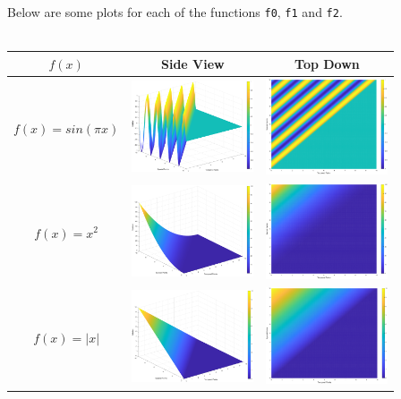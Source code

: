 \documentclass[]{report}
\def\incode#1{\texttt{#1}}
\begin{document}
	Below are some plots for each of the functions \incode{f0}, \incode{f1} and \incode{f2}. 
	\\\\
	\begin{tabular}{|c|c|c|}
		\hline
		$ f(x) $ & Side View & Top Down  \\
		\hline 
		$ f(x) = sin(\pi x) $ & \includegraphics[width=3.6cm]{transport/f0_side.eps} & \includegraphics[width=3.6cm]{transport/f0_top.eps} \\
		\hline
		$ f(x) = x^2 $ & \includegraphics[width=3.6cm]{transport/f1_side.eps} & \includegraphics[width=3.6cm]{transport/f1_top.eps}  \\
		\hline
		 $ f(x) = |x| $ & \includegraphics[width=3.6cm]{transport/f2_side.eps} & \includegraphics[width=3.6cm]{transport/f2_top.eps}  \\
		\hline
	\end{tabular}
\end{document}
